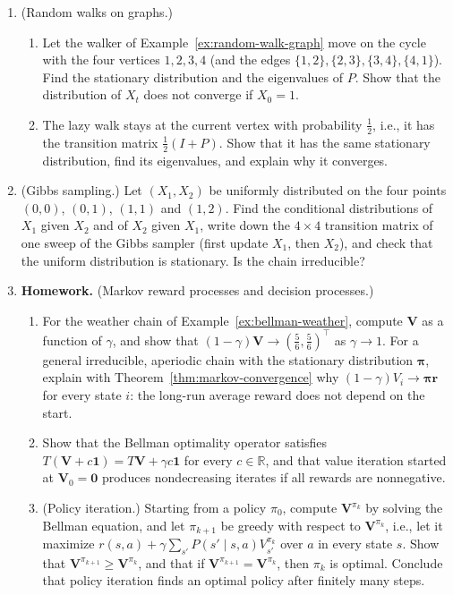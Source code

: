 \documentclass[11pt]{article}
\newcommand{\homework}{\textcolor{red!70!black}{\textbf{Homework.}}}
\theoremstyle{definition}
\theoremstyle{plain}
\theoremstyle{remark}
\begin{document}
\begin{enumerate}[leftmargin=*]
    Draw its transition graph, compute $P(X_2 = 3 \mid X_0 = 1)$, and find the stationary distribution. Is the chain irreducible and aperiodic? In the long run, what fraction of the time does it spend in state $1$?
    \item (Random walks on graphs.)
    \begin{enumerate}[label=(\alph*)]
        \item Let the walker of Example~\ref{ex:random-walk-graph} move on the cycle with the four vertices $1, 2, 3, 4$ (and the edges $\{1, 2\}, \{2, 3\}, \{3, 4\}, \{4, 1\}$). Find the stationary distribution and the eigenvalues of $P$. Show that the distribution of $X_t$ does not converge if $X_0 = 1$.
        \item The lazy walk stays at the current vertex with probability $\frac{1}{2}$, i.e., it has the transition matrix $\frac{1}{2}(I + P)$. Show that it has the same stationary distribution, find its eigenvalues, and explain why it converges.
    \end{enumerate}
    \item (Gibbs sampling.) Let $(X_1, X_2)$ be uniformly distributed on the four points $(0, 0)$, $(0, 1)$, $(1, 1)$ and $(1, 2)$. Find the conditional distributions of $X_1$ given $X_2$ and of $X_2$ given $X_1$, write down the $4 \times 4$ transition matrix of one sweep of the Gibbs sampler (first update $X_1$, then $X_2$), and check that the uniform distribution is stationary. Is the chain irreducible?
    \item\label{ex4:bellman-limit} \homework{} (Markov reward processes and decision processes.)
    \begin{enumerate}[label=(\alph*)]
        \item For the weather chain of Example~\ref{ex:bellman-weather}, compute $\mathbf{V}$ as a function of $\gamma$, and show that $(1 - \gamma)\mathbf{V} \to (\frac{5}{6}, \frac{5}{6})^\top$ as $\gamma \to 1$. For a general irreducible, aperiodic chain with the stationary distribution $\boldsymbol{\pi}$, explain with Theorem~\ref{thm:markov-convergence} why $(1 - \gamma)V_i \to \boldsymbol{\pi}\mathbf{r}$ for every state $i$: the long-run average reward does not depend on the start.
        \item Show that the Bellman optimality operator satisfies $T(\mathbf{V} + c\mathbf{1}) = T\mathbf{V} + \gamma c\mathbf{1}$ for every $c \in \mathbb{R}$, and that value iteration started at $\mathbf{V}_0 = \mathbf{0}$ produces nondecreasing iterates if all rewards are nonnegative.
        \item (Policy iteration.) Starting from a policy $\pi_0$, compute $\mathbf{V}^{\pi_k}$ by solving the Bellman equation, and let $\pi_{k+1}$ be greedy with respect to $\mathbf{V}^{\pi_k}$, i.e., let it maximize $r(s, a) + \gamma\sum_{s'}P(s' \mid s, a)V^{\pi_k}_{s'}$ over $a$ in every state $s$. Show that $\mathbf{V}^{\pi_{k+1}} \geq \mathbf{V}^{\pi_k}$, and that if $\mathbf{V}^{\pi_{k+1}} = \mathbf{V}^{\pi_k}$, then $\pi_k$ is optimal. Conclude that policy iteration finds an optimal policy after finitely many steps.

\end{enumerate}
\end{enumerate}
\end{document}
